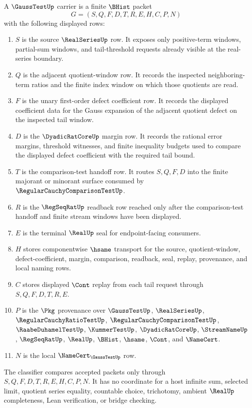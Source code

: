 \begin{definition}\label{def:gauss-test-carrier}
A $\GaussTestUp$ carrier is a finite $\BHist$ packet
$$
G=(S,Q,F,D,T,R,E,H,C,P,N)
$$
with the following displayed rows:
\begin{enumerate}
\item $S$ is the source $\RealSeriesUp$ row. It exposes only positive-term windows, partial-sum windows, and tail-threshold requests already visible at the real-series boundary.
\item $Q$ is the adjacent quotient-window row. It records the inspected neighboring-term ratios and the finite index window on which those quotients are read.
\item $F$ is the unary first-order defect coefficient row. It records the displayed coefficient data for the Gauss expansion of the adjacent quotient defect on the inspected tail window.
\item $D$ is the $\DyadicRatCoreUp$ margin row. It records the rational error margins, threshold witnesses, and finite inequality budgets used to compare the displayed defect coefficient with the required tail bound.
\item $T$ is the comparison-test handoff row. It routes $S,Q,F,D$ into the finite majorant or minorant surface consumed by $\RegularCauchyComparisonTestUp$.
\item $R$ is the $\RegSeqRatUp$ readback row reached only after the comparison-test handoff and finite stream windows have been displayed.
\item $E$ is the terminal $\RealUp$ seal for endpoint-facing consumers.
\item $H$ stores componentwise $\hsame$ transport for the source, quotient-window, defect-coefficient, margin, comparison, readback, seal, replay, provenance, and local naming rows.
\item $C$ stores displayed $\Cont$ replay from each tail request through $S,Q,F,D,T,R,E$.
\item $P$ is the $\Pkg$ provenance over $\GaussTestUp$, $\RealSeriesUp$, $\RegularCauchyRatioTestUp$, $\RegularCauchyComparisonTestUp$, $\RaabeDuhamelTestUp$, $\KummerTestUp$, $\DyadicRatCoreUp$, $\StreamNameUp$, $\RegSeqRatUp$, $\RealUp$, $\BHist$, $\hsame$, $\Cont$, and $\NameCert$.
\item $N$ is the local $\NameCert_{\GaussTestUp}$ row.
\end{enumerate}
The classifier compares accepted packets only through $S,Q,F,D,T,R,E,H,C,P,N$. It has no coordinate for a host infinite sum, selected limit, quotient series equality, countable choice, trichotomy, ambient $\RealUp$ completeness, Lean verification, or bridge checking.
\end{definition}

